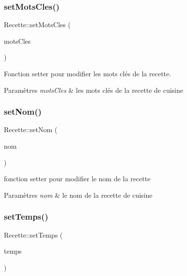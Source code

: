 \subsubsection{\texorpdfstring{set\+Mots\+Cles()}{setMotsCles()}}
{\footnotesize\ttfamily Recette\+::set\+Mots\+Cles (\begin{DoxyParamCaption}\item[{const Q\+String \&}]{mots\+Cles }\end{DoxyParamCaption})}



Fonction setter pour modifier les mots clés de la recette. 


\begin{DoxyParams}{Paramètres}
{\em mots\+Cles} & les mots clés de la recette de cuisine \\
\hline
\end{DoxyParams}
\mbox{\label{classRecette_a4880e64cbdc22a72600eee18cd0f921f}} 
\subsubsection{\texorpdfstring{set\+Nom()}{setNom()}}
{\footnotesize\ttfamily Recette\+::set\+Nom (\begin{DoxyParamCaption}\item[{const Q\+String \&}]{nom }\end{DoxyParamCaption})}



fonction setter pour modifier le nom de la recette 


\begin{DoxyParams}{Paramètres}
{\em nom} & le nom de la recette de cuisine \\
\hline
\end{DoxyParams}
\mbox{\label{classRecette_a9556fdb039545e6010b8ee1ab36068b7}} 
\subsubsection{\texorpdfstring{set\+Temps()}{setTemps()}}
{\footnotesize\ttfamily Recette\+::set\+Temps (\begin{DoxyParamCaption}\item[{const Q\+String \&}]{temps }\end{DoxyParamCaption})}



